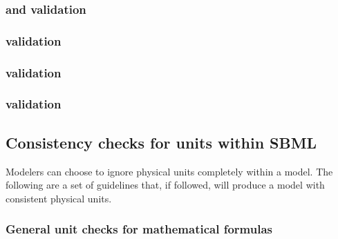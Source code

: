 \begin{sbmlenum}

\end{sbmlenum} \subsubsection*{ and  validation} \begin{sbmlenum}


\end{sbmlenum} \subsubsection*{ validation} \begin{sbmlenum}


\end{sbmlenum} \subsubsection*{ validation} \begin{sbmlenum}




\end{sbmlenum} \subsubsection*{ validation} \begin{sbmlenum}



\end{sbmlenum} 

\subsection{Consistency checks for units within SBML}

Modelers can choose to ignore physical units completely 
within a model.  The following are a set of guidelines that,
if followed, will produce a model with consistent physical units.

\subsubsection*{General unit checks for mathematical formulas} \begin{sbmlenum}


\end{sbmlenum} 

